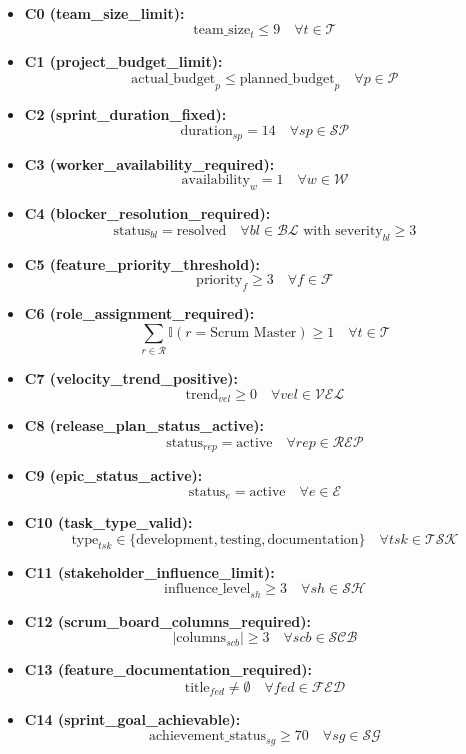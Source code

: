 \documentclass{article}
\begin{document}
\begin{itemize}
    \item \textbf{C0 (team\_size\_limit):}
    \[
    \text{team\_size}_t \leq 9 \quad \forall t \in \mathcal{T}
    \]
    \item \textbf{C1 (project\_budget\_limit):}
    \[
    \text{actual\_budget}_p \leq \text{planned\_budget}_p \quad \forall p \in \mathcal{P}
    \]
    \item \textbf{C2 (sprint\_duration\_fixed):}
    \[
    \text{duration}_{sp} = 14 \quad \forall sp \in \mathcal{SP}
    \]
    \item \textbf{C3 (worker\_availability\_required):}
    \[
    \text{availability}_w = 1 \quad \forall w \in \mathcal{W}
    \]
    \item \textbf{C4 (blocker\_resolution\_required):}
    \[
    \text{status}_{bl} = \text{resolved} \quad \forall bl \in \mathcal{BL} \text{ with } \text{severity}_{bl} \geq 3
    \]
    \item \textbf{C5 (feature\_priority\_threshold):}
    \[
    \text{priority}_f \geq 3 \quad \forall f \in \mathcal{F}
    \]
    \item \textbf{C6 (role\_assignment\_required):}
    \[
    \sum_{r \in \mathcal{R}} \mathbb{I}(r = \text{Scrum Master}) \geq 1 \quad \forall t \in \mathcal{T}
    \]
    \item \textbf{C7 (velocity\_trend\_positive):}
    \[
    \text{trend}_{vel} \geq 0 \quad \forall vel \in \mathcal{VEL}
    \]
    \item \textbf{C8 (release\_plan\_status\_active):}
    \[
    \text{status}_{rep} = \text{active} \quad \forall rep \in \mathcal{REP}
    \]
    \item \textbf{C9 (epic\_status\_active):}
    \[
    \text{status}_e = \text{active} \quad \forall e \in \mathcal{E}
    \]
    \item \textbf{C10 (task\_type\_valid):}
    \[
    \text{type}_{tsk} \in \{\text{development}, \text{testing}, \text{documentation}\} \quad \forall tsk \in \mathcal{TSK}
    \]
    \item \textbf{C11 (stakeholder\_influence\_limit):}
    \[
    \text{influence\_level}_{sh} \geq 3 \quad \forall sh \in \mathcal{SH}
    \]
    \item \textbf{C12 (scrum\_board\_columns\_required):}
    \[
    |\text{columns}_{scb}| \geq 3 \quad \forall scb \in \mathcal{SCB}
    \]
    \item \textbf{C13 (feature\_documentation\_required):}
    \[
    \text{title}_{fed} \neq \emptyset \quad \forall fed \in \mathcal{FED}
    \]
    \item \textbf{C14 (sprint\_goal\_achievable):}
    \[
    \text{achievement\_status}_{sg} \geq 70 \quad \forall sg \in \mathcal{SG}
    \]
\end{itemize}
\end{document}
